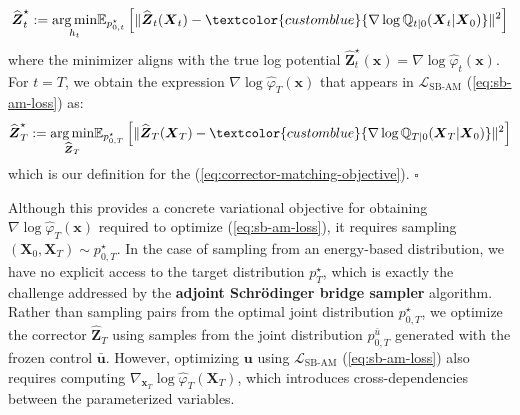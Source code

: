 \documentclass{article}
\newcommand{\boldtext}[1]{\textbf{\textcolor{MyGreen}{#1}}}
\newcommand{\bluetext}[1]{\textcolor{customblue}{#1}}
\begin{document}
\begin{align}
    \widehat{\boldsymbol{Z}}^\star_t:=\underset{h_t}{\arg\min}\mathbb{E}_{p^\star_{0,t}}\left[\|\widehat{\boldsymbol{Z}}_t(\boldsymbol{X}_t)-\bluetext{\nabla \log \mathbb{Q}_{t|0}(\boldsymbol{X}_t|\boldsymbol{X}_0)}\|^2\right]
\end{align}
where the minimizer aligns with the true log potential $\widehat{\boldsymbol{Z}}^\star_t(\boldsymbol{x})=\nabla \log \hat{\varphi}_t(\boldsymbol{x})$. For $t=T$, we obtain the expression $\nabla \log\hat{\varphi}_T(\boldsymbol{x})$ that appears in $\mathcal{L}_{\text{SB-AM}}$ (\ref{eq:sb-am-loss}) as:
\begin{align}
    \widehat{\boldsymbol{Z}}^\star_T:=\underset{\widehat{\boldsymbol{Z}}_T}{\arg\min}\mathbb{E}_{p^\star_{0,T}}\left[\|\widehat{\boldsymbol{Z}}_T(\boldsymbol{X}_T)-\bluetext{\nabla \log \mathbb{Q}_{T|0}(\boldsymbol{X}_T|\boldsymbol{X}_0)}\|^2\right]
\end{align}
which is our definition for the (\ref{eq:corrector-matching-objective}). \hfill $\square$

Although this provides a concrete variational objective for obtaining $\nabla \log \hat{\varphi}_T(\boldsymbol{x})$ required to optimize (\ref{eq:sb-am-loss}), it requires sampling $(\boldsymbol{X}_0, \boldsymbol{X}_T)\sim p^\star_{0,T}$. In the case of sampling from an energy-based distribution, we have no explicit access to the target distribution $p_T^\star$, which is exactly the challenge addressed by the \boldtext{adjoint Schrödinger bridge sampler} \citep{liu2025adjoint} algorithm. Rather than sampling pairs from the optimal joint distribution $p^\star_{0,T}$, we optimize the corrector $\widehat{\boldsymbol{Z}}_T$ using samples from the joint distribution $p^{\bar{u}}_{0,T}$ generated with the frozen control $\bar{\boldsymbol{u}}$. However, optimizing $\boldsymbol{u}$ using $\mathcal{L}_{\text{SB-AM}}$ (\ref{eq:sb-am-loss}) also requires computing $\nabla_{\boldsymbol{x}_T}\log \hat{\varphi}_T(\boldsymbol{X}_T)$, which introduces cross-dependencies between the parameterized variables.
\end{document}

